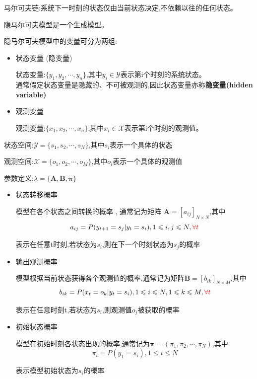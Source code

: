 \documentclass[UTF8,a4paper]{ctexart}%
\begin{document}
            马尔可夫链:系统下一时刻的状态仅由当前状态决定,不依赖以往的任何状态。

            隐马尔可夫模型是一个生成模型。

            隐马尔可夫模型中的变量可分为两组:
            \begin{itemize}
              \item 状态变量 (隐变量)

                  状态变量:$\{y_1, y_2 , \cdots , y_n\}$,其中$y_i \in \mathcal{Y} $表示第i个时刻的系统状态。\\
                  通常假定状态变量是隐藏的、不可被观测的,因此状态变量亦称\textbf{隐变量(hidden variable)}

              \item 观测变量

                  观测变量:$\{x_1, x_2 , \cdots , x_n\}$,其中$x_i \in \mathcal{X} $表示第i个时刻的观测值。
            \end{itemize}

            状态空间:$\mathcal{Y} = \{s_1,s_2,\cdots , s_N\}$,其中$s_i$表示一个具体的状态

            观测空间:$\mathcal{X} = \{o_1,o_2,\cdots , o_M\}$,其中$o_i$表示一个具体的观测值

            参数定义:$\lambda = \{\bm{A,B,\pi}\}$
            \begin{itemize}
              \item 状态转移概率

                  模型在各个状态之间转换的概率 , 通常记为矩阵 $\bm{A} = [a_{ij}]_{N\times N}$,其中
                  \[ a_{ij} = P(y_{t+1} = s_j | y_t = s_i) , 1 \leqslant i,j \leqslant N , {\color{red} \forall t }\]

                  表示在任意t时刻,若状态为$s_i$,则在下一个时刻状态为$s_j$的概率

              \item 输出观测概率

                  模型根据当前状态获得各个观测值的概率,通常记为矩阵$\bm{B} = [b_{ik}]_{N\times M}$,其中
                  \[ b_{ik} = P(x_t = o_k | y_t = s_i)  ,1 \leqslant i \leqslant N ,1 \leqslant k \leqslant M ,{\color{red} \forall t }\]

                  表示在任意时刻t,若状态为$s_i$,则观测值$o_j$被获取的概率

              \item 初始状态概率

                  模型在初始时刻各状态出现的概率,通常记为$\bm{\pi} = (\pi_1 , \pi_2 , \cdots ,\pi_N)$,其中
                  \[ \pi_i = P(y_1 = s_i) , 1 \leqslant i \leqslant N \]

                  表示模型初始状态为$s_i$的概率
            \end{itemize}
\end{document}
